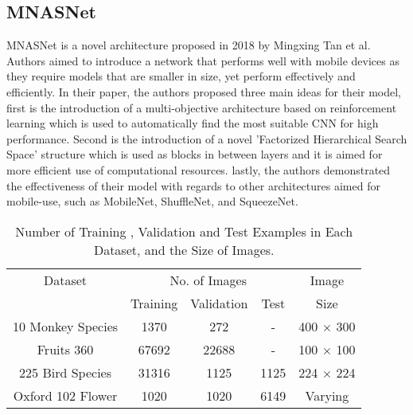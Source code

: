 \documentclass[conference]{IEEEtran}
\begin{document}
\subsection{MNASNet}
MNASNet is a novel architecture proposed in 2018 by Mingxing Tan et al. Authors aimed to introduce a network that performs well with mobile devices as they require models that are smaller in size, yet perform effectively and efficiently. In their paper, the authors proposed three main ideas for their model, first is the introduction of a multi-objective architecture based on reinforcement learning which is used to automatically find the most suitable CNN for high performance. Second is the introduction of a novel 'Factorized Hierarchical Search Space' structure which is used as blocks in between layers and it is aimed for more efficient use of computational resources. lastly, the authors demonstrated the effectiveness of their model with regards to other architectures aimed for mobile-use, such as MobileNet, ShuffleNet, and SqueezeNet.


\begin{table}
		\caption{Number of Training , Validation and Test Examples in Each Dataset, and the Size of Images.}
		\label{Data} \centering
\begin{tabular}{|c|c|c|c|c|}	\hline
    Dataset& \multicolumn{3}{|c|}{No. of Images} & Image\\ \cline{2-4}
	 & Training  & Validation    &Test 	&  Size \\ \hline
	   
	10 Monkey Species & 1370	&	272   & -   & 400 $\times$ 300    \\ \hline
	
	Fruits 360 & 67692	&	22688   & -   & 100 $\times$ 100    \\ \hline
	225 Bird Species & 31316 & 1125 & 1125 & 224 $\times$ 224    \\ \hline
	Oxford 102 Flower & 1020 & 1020 & 6149 & Varying    \\ \hline
\end{tabular} 
\end{table}	
\end{document}
